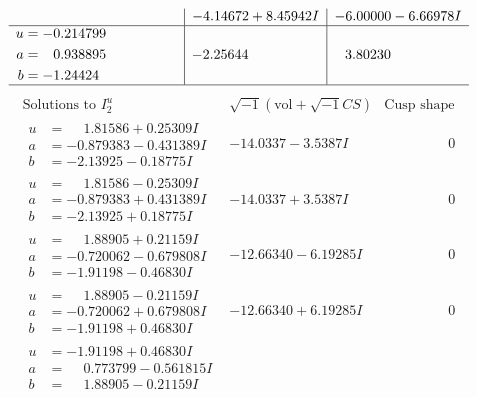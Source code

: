 \documentclass[1p]{elsarticle_modified}
\theoremstyle{definition}
\newcommand{\I}{\sqrt{-1}}
\begin{document}
$$\begin{array}{c|c|c}
 & -4.14672 + 8.45942 I & -6.00000 - 6.66978 I \\ \hline\begin{aligned}
u &= -0.214799\phantom{ +0.000000I} \\
a &= \phantom{-}0.938895\phantom{ +0.000000I} \\
b &= -1.24424\phantom{ +0.000000I}\end{aligned}
 & -2.25644\phantom{ +0.000000I} & \phantom{-}3.80230\phantom{ +0.000000I}\\
 \hline 
 \end{array}$$\newpage$$\begin{array}{c|c|c}  
\text{Solutions to }I^u_{2}& \I (\text{vol} + \sqrt{-1}CS) & \text{Cusp shape}\\
 \hline 
\begin{aligned}
u &= \phantom{-}1.81586 + 0.25309 I \\
a &= -0.879383 - 0.431389 I \\
b &= -2.13925 - 0.18775 I\end{aligned}
 & -14.0337 - 3.5387 I & \phantom{-0.000000 } 0 \\ \hline\begin{aligned}
u &= \phantom{-}1.81586 - 0.25309 I \\
a &= -0.879383 + 0.431389 I \\
b &= -2.13925 + 0.18775 I\end{aligned}
 & -14.0337 + 3.5387 I & \phantom{-0.000000 } 0 \\ \hline\begin{aligned}
u &= \phantom{-}1.88905 + 0.21159 I \\
a &= -0.720062 - 0.679808 I \\
b &= -1.91198 - 0.46830 I\end{aligned}
 & -12.66340 - 6.19285 I & \phantom{-0.000000 } 0 \\ \hline\begin{aligned}
u &= \phantom{-}1.88905 - 0.21159 I \\
a &= -0.720062 + 0.679808 I \\
b &= -1.91198 + 0.46830 I\end{aligned}
 & -12.66340 + 6.19285 I & \phantom{-0.000000 } 0 \\ \hline\begin{aligned}
u &= -1.91198 + 0.46830 I \\
a &= \phantom{-}0.773799 - 0.561815 I \\
b &= \phantom{-}1.88905 - 0.21159 I\end{aligned}

\end{array}$$
\end{document}

